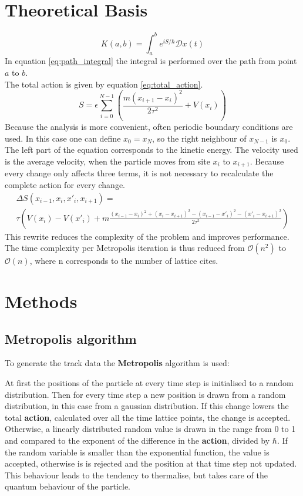 \documentclass{scrartcl}
\begin{document}
	\section{Theoretical Basis}
		\begin{equation}
			K(a, b) = \int_a^b e^{iS/\hbar} \mathcal Dx(t)
			\label{eq:path_integral}
		\end{equation}
		In equation \ref{eq:path_integral} the integral is performed over the path from point $a$ to $b$.
		\\
		The total action is given by equation \ref{eq:total_action}.
		\begin{equation}
			S = \epsilon \sum_{i=0}^{N - 1} \left(\frac{m(x_{i+1} - x_i)^2}{2\tau^2} + V(x_i)\right)
			\label{eq:total_action}
		\end{equation}
		Because the analysis is more convenient, often periodic boundary conditions are used.
		In this case one can define $x_0 = x_N$, so the right neighbour of $x_{N-1}$ is $x_0$.
		The left part of the equation corresponds to the kinetic energy.
		The velocity used is the average velocity, when the particle moves from site $x_i$ to $x_{i+1}$.
		Because every change only affects three terms, it is not necessary to recalculate the complete action for every change.
		\begin{equation}
			\begin{split}
				\Delta S(x_{i-1}, x_i, x'_i, x_{i+1}) =\\
				\tau\left(V(x_i) - V(x'_i) + m\frac{(x_{i-1} - x_i)^2 + (x_i - x_{i+1})^2 - (x_{i-1} - x'_i)^2 - (x'_i - x_{i+1})^2}{2\tau^2}\right)
			\end{split}
			\label{eq:delta_total_action}
		\end{equation}
		This rewrite reduces the complexity of the problem and improves performance.
		The time complexity per Metropolis iteration is thus reduced from $\mathcal O(n^2)$ to $\mathcal O(n)$, where n corresponds to the number of lattice cites.
	\section{Methods}

	\subsection{Metropolis algorithm}
		To generate the track data the \textbf{Metropolis} algorithm is used:

		At first the positions of the particle at every time step is initialised to a random distribution.
		Then for every time step a new position is drawn from a random distribution, in this case from a gaussian distribution.
		If this change lowers the total \textbf{action}, calculated over all the time lattice points, the change is accepted.
		Otherwise, a linearly distributed random value is drawn in the range from 0 to 1 and compared to the exponent of the difference in the \textbf{action}, divided by $\hbar$.
		If the random variable is smaller than the exponential function, the value is accepted, otherwise is is rejected and the position at that time step not updated.
		This behaviour leads to the tendency to thermalise, but takes care of the quantum behaviour of the particle.
\end{document}
